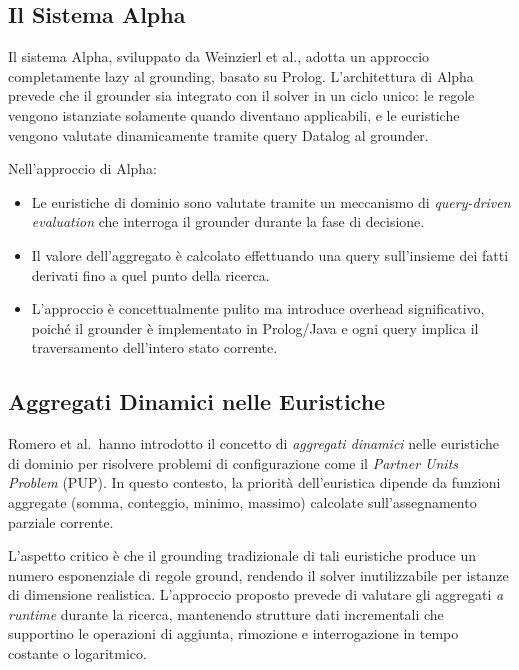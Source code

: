 \documentclass[a4paper,12pt,twoside,openright]{report}
\begin{document}
\subsection{Il Sistema Alpha}

Il sistema Alpha, sviluppato da Weinzierl et al., adotta un approccio completamente lazy al grounding, basato su Prolog. L'architettura di Alpha prevede che il grounder sia integrato con il solver in un ciclo unico: le regole vengono istanziate solamente quando diventano applicabili, e le euristiche vengono valutate dinamicamente tramite query Datalog al grounder.

Nell'approccio di Alpha:
\begin{itemize}
    \item Le euristiche di dominio sono valutate tramite un meccanismo di \emph{query-driven evaluation} che interroga il grounder durante la fase di decisione.
    \item Il valore dell'aggregato \`{e} calcolato effettuando una query sull'insieme dei fatti derivati fino a quel punto della ricerca.
    \item L'approccio \`{e} concettualmente pulito ma introduce overhead significativo, poich\'{e} il grounder \`{e} implementato in Prolog/Java e ogni query implica il traversamento dell'intero stato corrente.
\end{itemize}

\subsection{Aggregati Dinamici nelle Euristiche}
\label{sec:aggregati_dinamici_letteratura}

Romero et al.\ hanno introdotto il concetto di \emph{aggregati dinamici} nelle euristiche di dominio per risolvere problemi di configurazione come il \emph{Partner Units Problem} (PUP). In questo contesto, la priorit\`{a} dell'euristica dipende da funzioni aggregate (somma, conteggio, minimo, massimo) calcolate sull'assegnamento parziale corrente.

L'aspetto critico \`{e} che il grounding tradizionale di tali euristiche produce un numero esponenziale di regole ground, rendendo il solver inutilizzabile per istanze di dimensione realistica. L'approccio proposto prevede di valutare gli aggregati \emph{a runtime} durante la ricerca, mantenendo strutture dati incrementali che supportino le operazioni di aggiunta, rimozione e interrogazione in tempo costante o logaritmico.

\end{document}
